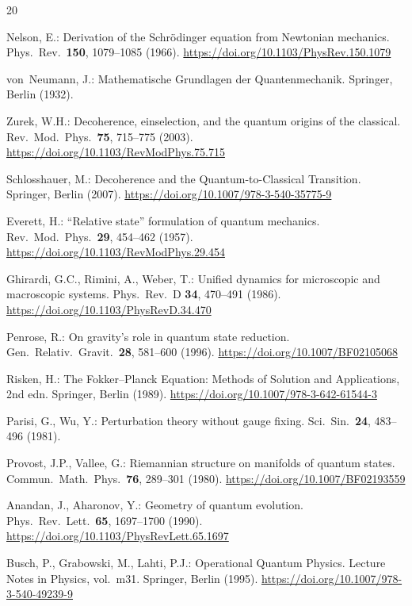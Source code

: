 \documentclass[11pt,a4paper]{article}
\theoremstyle{definition}
\begin{document}
\begin{thebibliography}{20}

Nelson, E.:
Derivation of the Schr\"odinger equation from Newtonian mechanics.
Phys.\ Rev.\ \textbf{150}, 1079--1085 (1966).
\url{https://doi.org/10.1103/PhysRev.150.1079}

von~Neumann, J.:
Mathematische Grundlagen der Quantenmechanik.
Springer, Berlin (1932).

Zurek, W.H.:
Decoherence, einselection, and the quantum origins of the classical.
Rev.\ Mod.\ Phys.\ \textbf{75}, 715--775 (2003).
\url{https://doi.org/10.1103/RevModPhys.75.715}

Schlosshauer, M.:
Decoherence and the Quantum-to-Classical Transition.
Springer, Berlin (2007).
\url{https://doi.org/10.1007/978-3-540-35775-9}

Everett, H.:
``Relative state'' formulation of quantum mechanics.
Rev.\ Mod.\ Phys.\ \textbf{29}, 454--462 (1957).
\url{https://doi.org/10.1103/RevModPhys.29.454}

Ghirardi, G.C., Rimini, A., Weber, T.:
Unified dynamics for microscopic and macroscopic systems.
Phys.\ Rev.\ D \textbf{34}, 470--491 (1986).
\url{https://doi.org/10.1103/PhysRevD.34.470}

Penrose, R.:
On gravity's role in quantum state reduction.
Gen.\ Relativ.\ Gravit.\ \textbf{28}, 581--600 (1996).
\url{https://doi.org/10.1007/BF02105068}

Risken, H.:
The Fokker--Planck Equation: Methods of Solution and Applications, 2nd edn.
Springer, Berlin (1989).
\url{https://doi.org/10.1007/978-3-642-61544-3}

Parisi, G., Wu, Y.:
Perturbation theory without gauge fixing.
Sci.\ Sin.\ \textbf{24}, 483--496 (1981).

Provost, J.P., Vallee, G.:
Riemannian structure on manifolds of quantum states.
Commun.\ Math.\ Phys.\ \textbf{76}, 289--301 (1980).
\url{https://doi.org/10.1007/BF02193559}

Anandan, J., Aharonov, Y.:
Geometry of quantum evolution.
Phys.\ Rev.\ Lett.\ \textbf{65}, 1697--1700 (1990).
\url{https://doi.org/10.1103/PhysRevLett.65.1697}

Busch, P., Grabowski, M., Lahti, P.J.:
Operational Quantum Physics.
Lecture Notes in Physics, vol.\ m31. Springer, Berlin (1995).
\url{https://doi.org/10.1007/978-3-540-49239-9}

\end{thebibliography}
\end{document}

